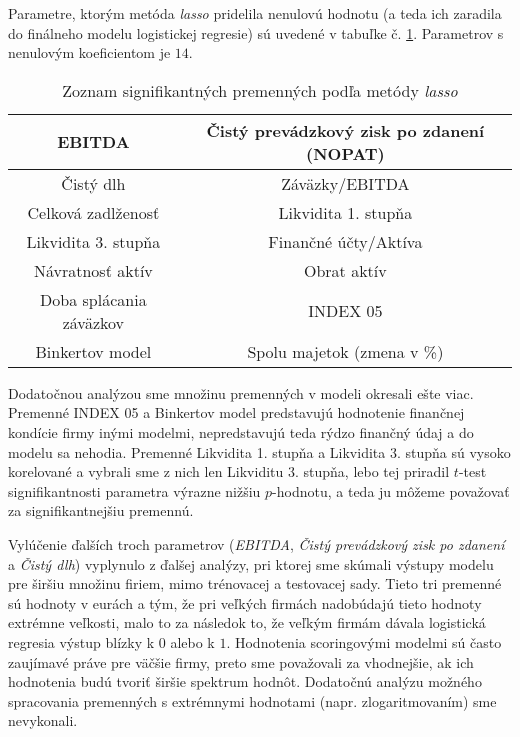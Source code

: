 Parametre, ktorým metóda \emph{lasso} pridelila nenulovú hodnotu (a teda ich zaradila do finálneho modelu logistickej regresie) sú uvedené v tabuľke č. \ref{lasso tabulka vsetky parametre}.
Parametrov s nenulovým koeficientom je \(14\).

\begin{table}
    \begin{tabular}{ |c|c| }
        \hline
        EBITDA & Čistý prevádzkový zisk po zdanení (NOPAT) \\
        \hline
        Čistý dlh & Záväzky/EBITDA \\
        \hline
        Celková zadlženosť & Likvidita 1. stupňa\\
        \hline
        Likvidita 3. stupňa & Finančné účty/Aktíva \\
        \hline
        Návratnosť aktív & Obrat aktív \\
        \hline
        Doba splácania záväzkov & INDEX 05 \\
        \hline
        Binkertov model & Spolu majetok (zmena v \%) \\
        \hline
    \end{tabular}
    \caption{Zoznam signifikantných premenných podľa metódy \emph{lasso}}
    \label{lasso tabulka vsetky parametre}
\end{table}

Dodatočnou analýzou sme množinu premenných v modeli okresali ešte viac.
Premenné INDEX 05 a Binkertov model predstavujú hodnotenie finančnej kondície firmy inými modelmi, nepredstavujú teda rýdzo finančný údaj a do modelu sa nehodia.
Premenné Likvidita 1. stupňa a Likvidita 3. stupňa sú vysoko korelované a vybrali sme z nich len Likviditu 3. stupňa,
lebo tej priradil \(t\)-test signifikantnosti parametra výrazne nižšiu \(p\)-hodnotu, a teda ju môžeme považovať za signifikantnejšiu premennú.

Vylúčenie ďalších troch parametrov (\emph{EBITDA}, \emph{Čistý prevádzkový zisk po zdanení} a \emph{Čistý dlh}) vyplynulo z ďalšej analýzy,
pri ktorej sme skúmali výstupy modelu pre širšiu množinu firiem, mimo trénovacej a testovacej sady.
Tieto tri premenné sú hodnoty v eurách a tým, že pri veľkých firmách nadobúdajú tieto hodnoty extrémne veľkosti,
malo to za následok to, že veľkým firmám dávala logistická regresia výstup blízky k \(0\) alebo k \(1\).
Hodnotenia scoringovými modelmi sú často zaujímavé práve pre väčšie firmy, preto sme považovali za vhodnejšie, ak ich hodnotenia budú tvoriť širšie spektrum hodnôt.
Dodatočnú analýzu možného spracovania premenných s extrémnymi hodnotami (napr. zlogaritmovaním) sme nevykonali.

